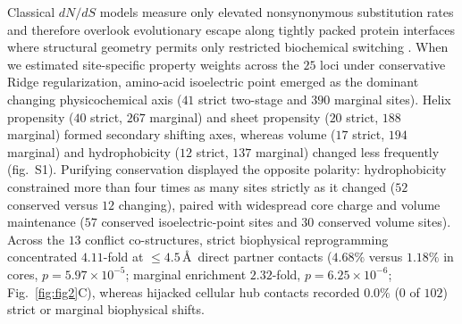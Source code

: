 \documentclass[12pt]{article}
\begin{document}
Classical $dN/dS$ models measure only elevated nonsynonymous substitution rates and therefore overlook evolutionary escape along tightly packed protein interfaces where structural geometry permits only restricted biochemical switching \cite{tenthorey2020mutational,mitchell2012evolution}. When we estimated site-specific property weights across the $25$ loci under conservative Ridge regularization, amino-acid isoelectric point emerged as the dominant changing physicochemical axis ($41$ strict two-stage and $390$ marginal sites). Helix propensity ($40$ strict, $267$ marginal) and sheet propensity ($20$ strict, $188$ marginal) formed secondary shifting axes, whereas volume ($17$ strict, $194$ marginal) and hydrophobicity ($12$ strict, $137$ marginal) changed less frequently (fig.~S1). Purifying conservation displayed the opposite polarity: hydrophobicity constrained more than four times as many sites strictly as it changed ($52$ conserved versus $12$ changing), paired with widespread core charge and volume maintenance ($57$ conserved isoelectric-point sites and $30$ conserved volume sites). Across the $13$ conflict co-structures, strict biophysical reprogramming concentrated $4.11$-fold at $\le 4.5$\,\AA\ direct partner contacts ($4.68\%$ versus $1.18\%$ in cores, $p = 5.97 \times 10^{-5}$; marginal enrichment $2.32$-fold, $p = 6.25 \times 10^{-6}$; Fig.~\ref{fig:fig2}C), whereas hijacked cellular hub contacts recorded $0.0\%$ ($0$ of $102$) strict or marginal biophysical shifts.
\end{document}

